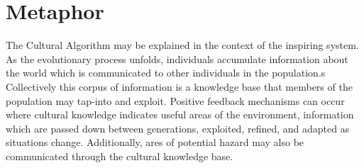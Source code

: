 \documentclass[a4paper, 11pt]{article}
\begin{document}
\section{Metaphor}
\label{sec:metaphor}
The Cultural Algorithm may be explained in the context of the inspiring system. As the evolutionary process unfolds, individuals accumulate information about the world which is communicated to other individuals in the population.s Collectively this corpus of information is a knowledge base that members of the population may tap-into and exploit. Positive feedback mechanisms can occur where cultural knowledge indicates useful areas of the environment, information which are passed down between generations, exploited, refined, and adapted as situations change. Additionally, ares of potential hazard may also be communicated through the cultural knowledge base.

\end{document}
